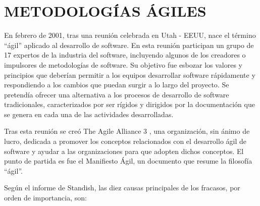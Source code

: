 \section{\textbf{METODOLOGÍAS ÁGILES}}
		En febrero de 2001, tras una reunión celebrada en Utah - EEUU, nace el término “ágil” aplicado al desarrollo de software. En esta reunión participan un grupo de 17 expertos de la industria del software, incluyendo algunos de los creadores o impulsores de metodologías de software. Su objetivo fue esbozar los valores y principios que deberían permitir a los equipos desarrollar software rápidamente y respondiendo a los cambios que puedan surgir a lo largo del proyecto. Se pretendía ofrecer una alternativa a los procesos de desarrollo de software tradicionales, caracterizados por ser rígidos y dirigidos por la documentación que se genera en cada una de las
		actividades desarrolladas.\vspace*{0.3in}
		
		Tras esta reunión se creó The Agile Alliance 3 , una organización, sin ánimo de lucro, dedicada a promover los conceptos relacionados con el desarrollo ágil de software y ayudar a las organizaciones para que adopten dichos conceptos. El punto de partida es fue el Manifiesto Ágil,
		un documento que resume la filosofía “ágil”.\vspace*{0.3in}
		
		Según el informe de Standish, las diez causas principales de los fracasos, por orden de importancia, son:\vspace*{0.3in}
		
